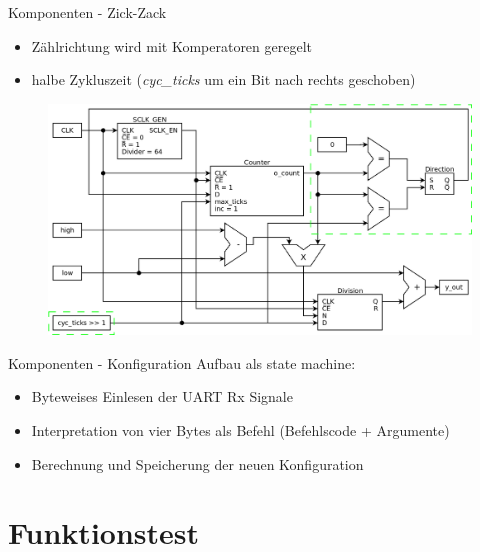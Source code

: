 \documentclass[11pt]{beamer}
\begin{document}
\begin{frame}{Komponenten - Zick-Zack}
  \begin{itemize}
    \item Zählrichtung wird mit Komperatoren geregelt
    \item halbe Zykluszeit (\emph{cyc\_ticks} um ein Bit nach rechts geschoben)
  \end{itemize}
  \begin{figure}
    \includegraphics[scale=0.28]{zigzag}
  \end{figure}
\end{frame}

\begin{frame}{Komponenten - Konfiguration}
  Aufbau als state machine:
  \begin{itemize}
  \item Byteweises Einlesen der UART Rx Signale 
  \item Interpretation von vier Bytes als Befehl (Befehlscode + Argumente) 
  \item Berechnung und Speicherung der neuen Konfiguration
  \end{itemize}
  \resizebox{\textwidth}{!}{
    
  }
\end{frame}

\section{Funktionstest}
\end{document}
